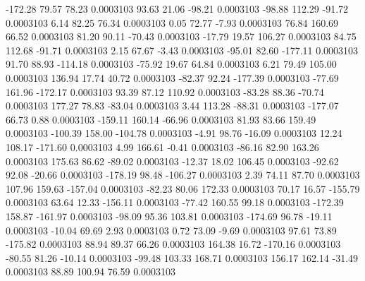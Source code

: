      -172.28       79.57       78.23     0.0003103
       93.63       21.06      -98.21     0.0003103
      -98.88      112.29      -91.72     0.0003103
        6.14       82.25       76.34     0.0003103
        0.05       72.77       -7.93     0.0003103
       76.84      160.69       66.52     0.0003103
       81.20       90.11      -70.43     0.0003103
      -17.79       19.57      106.27     0.0003103
       84.75      112.68      -91.71     0.0003103
        2.15       67.67       -3.43     0.0003103
      -95.01       82.60     -177.11     0.0003103
       91.70       88.93     -114.18     0.0003103
      -75.92       19.67       64.84     0.0003103
        6.21       79.49      105.00     0.0003103
      136.94       17.74       40.72     0.0003103
      -82.37       92.24     -177.39     0.0003103
      -77.69      161.96     -172.17     0.0003103
       93.39       87.12      110.92     0.0003103
      -83.28       88.36      -70.74     0.0003103
      177.27       78.83      -83.04     0.0003103
        3.44      113.28      -88.31     0.0003103
     -177.07       66.73        0.88     0.0003103
     -159.11      160.14      -66.96     0.0003103
       81.93       83.66      159.49     0.0003103
     -100.39      158.00     -104.78     0.0003103
       -4.91       98.76      -16.09     0.0003103
       12.24      108.17     -171.60     0.0003103
        4.99      166.61       -0.41     0.0003103
      -86.16       82.90      163.26     0.0003103
      175.63       86.62      -89.02     0.0003103
      -12.37       18.02      106.45     0.0003103
      -92.62       92.08      -20.66     0.0003103
     -178.19       98.48     -106.27     0.0003103
        2.39       74.11       87.70     0.0003103
      107.96      159.63     -157.04     0.0003103
      -82.23       80.06      172.33     0.0003103
       70.17       16.57     -155.79     0.0003103
       63.64       12.33     -156.11     0.0003103
      -77.42      160.55       99.18     0.0003103
     -172.39      158.87     -161.97     0.0003103
      -98.09       95.36      103.81     0.0003103
     -174.69       96.78      -19.11     0.0003103
      -10.04       69.69        2.93     0.0003103
        0.72       73.09       -9.69     0.0003103
       97.61       73.89     -175.82     0.0003103
       88.94       89.37       66.26     0.0003103
      164.38       16.72     -170.16     0.0003103
      -80.55       81.26      -10.14     0.0003103
      -99.48      103.33      168.71     0.0003103
      156.17      162.14      -31.49     0.0003103
       88.89      100.94       76.59     0.0003103
